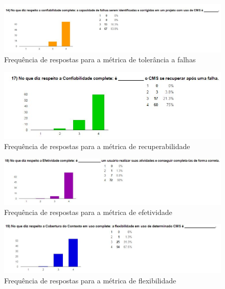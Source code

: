 \begin{figure}[!htb]
\centering
\includegraphics[keepaspectratio=true,scale=0.6]{figuras/Ques_2/q14_fig.jpg}
\caption{Frequência de respostas para a métrica de tolerância a falhas}
\label{res_q2-16}
\end{figure}


\begin{figure}[!htb]
\centering
\includegraphics[keepaspectratio=true,scale=0.8]{figuras/Ques_2/q17_fig.jpg}
\caption{Frequência de respostas para a métrica de recuperabilidade}
\label{res_q2-17}
\end{figure}


\begin{figure}[!htbp]
\centering
\includegraphics[keepaspectratio=true,scale=0.6]{figuras/Ques_2/q18_fig.jpg}
\caption{Frequência de respostas para a métrica de efetividade}
\label{res_q2-18}
\end{figure}
\clearpage
\begin{figure}[!htb]
\centering
\includegraphics[keepaspectratio=true,scale=0.6]{figuras/Ques_2/q19_fig.jpg}
\caption{Frequência de respostas para a métrica de flexibilidade}
\label{res_q2-19}
\end{figure}


